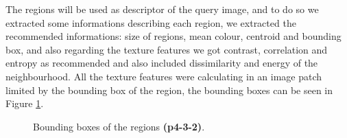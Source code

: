 \documentclass[12pt,a4paper]{article}
\begin{document}
	The regions will be used as descriptor of the query image, and to do so we extracted some informations describing each region, we extracted the recommended informations: size of regions, mean colour, centroid and bounding box, and also regarding the texture features we got contrast, correlation and entropy as recommended and also included dissimilarity and energy of the neighbourhood. All the texture features were calculating in an image patch limited by the bounding box of the region, the bounding boxes can be seen in Figure \ref{fig:bbox}.

\begin{figure}[!h]
	\centering
		{
			\setlength{\fboxsep}{1pt}
			\setlength{\fboxrule}{1pt}
		}
	\caption{Bounding boxes of the regions \textbf{(p4-3-2)}.}
	\label{fig:bbox}
\end{figure}
\end{document}
